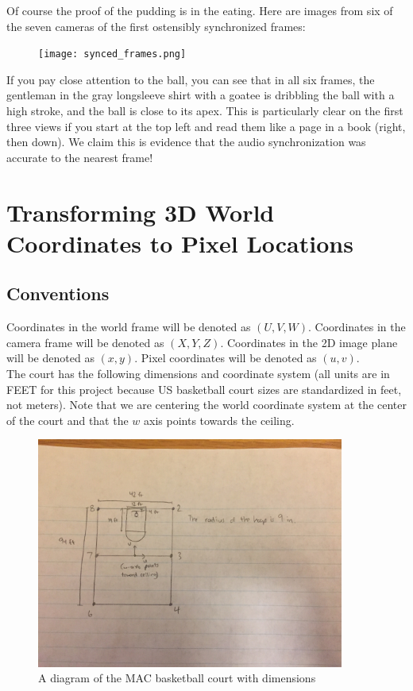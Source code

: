 \documentclass{article}
\begin{document}
Of course the proof of the pudding is in the eating.  
Here are images from six of the seven cameras of the first ostensibly synchronized frames:
\begin{figure}[H]
\center
\texttt{[image: synced\_frames.png]}
\end{figure}

If you pay close attention to the ball, you can see that in all six frames, the gentleman
in the gray longsleeve shirt with a goatee is dribbling the ball with a high stroke, 
and the ball is close to its apex.  This is particularly clear on the first three views
if you start at the top left and read them like a page in a book (right, then down).
We claim this is evidence that the audio synchronization was accurate to the nearest frame!

\newpage
\section{Transforming 3D World Coordinates to Pixel Locations}
\subsection{Conventions}
Coordinates in the world frame will be denoted as $(U, V, W)$. Coordinates in the camera frame will be denoted as $(X, Y, Z)$. 
Coordinates in the 2D image plane will be denoted as $(x, y)$. Pixel coordinates will be denoted as $(u, v)$. \\

The court has the following dimensions and coordinate system 
(all units are in FEET for this project because US basketball court sizes are standardized in feet, not meters). 
Note that we are centering the world coordinate system at the center of the court and that the $w$ axis points towards the ceiling.

\begin{figure}[H]
\centering
\includegraphics[width=0.90\textwidth]{Court_Diagram}
\caption*{A diagram of the MAC basketball court with dimensions}
\end{figure}
\end{document}
